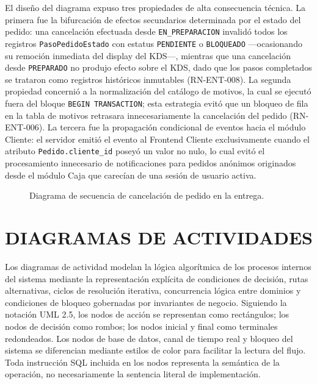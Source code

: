 El diseño del diagrama expuso tres propiedades de alta consecuencia técnica. La primera fue la bifurcación de efectos secundarios determinada por el estado del pedido: una cancelación efectuada desde \texttt{EN\_PREPARACION} invalidó todos los registros \texttt{PasoPedidoEstado} con estatus \texttt{PENDIENTE} o \texttt{BLOQUEADO} ---ocasionando su remoción inmediata del display del KDS---, mientras que una cancelación desde \texttt{PREPARADO} no produjo efecto sobre el KDS, dado que los pasos completados se trataron como registros históricos inmutables (RN-ENT-008). La segunda propiedad concernió a la normalización del catálogo de motivos, la cual se ejecutó fuera del bloque \texttt{BEGIN TRANSACTION}; esta estrategia evitó que un bloqueo de fila en la tabla de motivos retrasara innecesariamente la cancelación del pedido (RN-ENT-006). La tercera fue la propagación condicional de eventos hacia el módulo Cliente: el servidor emitió el evento al Frontend Cliente exclusivamente cuando el atributo \texttt{Pedido.cliente\_id} poseyó un valor no nulo, lo cual evitó el procesamiento innecesario de notificaciones para pedidos anónimos originados desde el módulo Caja que carecían de una sesión de usuario activa. 
\begin{landscape}
\begin{figure}[H]
    \centering
    
    \caption{Diagrama de secuencia de cancelación de pedido en la entrega.}
    \label{fig:diagrama-secuencia-cancelacion-pedido}
\end{figure}    
\end{landscape}
\section{DIAGRAMAS DE ACTIVIDADES}
Los diagramas de actividad modelan la lógica algorítmica de los procesos internos del sistema mediante la representación explícita de condiciones de decisión, rutas alternativas, ciclos de resolución iterativa, concurrencia lógica entre dominios y condiciones de bloqueo gobernadas por invariantes de negocio. Siguiendo la notación UML 2.5, los nodos de acción se representan como rectángulos; los nodos de decisión como rombos; los nodos inicial y final como terminales redondeados. Los nodos de base de datos, canal de tiempo real y bloqueo del sistema se diferencian mediante estilos de color para facilitar la lectura del flujo. Toda instrucción SQL incluida en los nodos representa la semántica de la operación, no necesariamente la sentencia literal de implementación.

